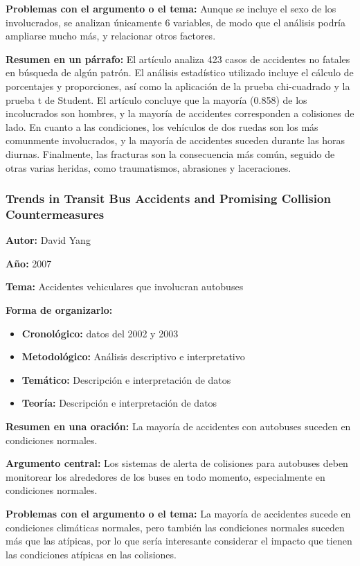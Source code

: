 \documentclass{book}
\begin{document}
\textbf{Problemas con el argumento o el tema:} Aunque se incluye el sexo de los involucrados, se analizan únicamente 6 variables, de modo que el análisis podría ampliarse mucho más, y relacionar otros factores.

\textbf{Resumen en un párrafo:} El artículo analiza 423 casos de accidentes no fatales en búsqueda de algún patrón. El análisis estadístico utilizado incluye el cálculo de porcentajes y proporciones, así como la aplicación de la prueba chi-cuadrado y la prueba t de Student. El artículo concluye que la mayoría (0.858) de los incolucrados son hombres, y la mayoría de accidentes corresponden a colisiones de lado. En cuanto a las condiciones, los vehículos de dos ruedas son los más comunmente involucrados, y la mayoría de accidentes suceden durante las horas diurnas. Finalmente, las fracturas son la consecuencia más común, seguido de otras varias heridas, como traumatismos, abrasiones y laceraciones.


\subsubsection{Trends in Transit Bus Accidents and Promising Collision Countermeasures}
\textbf{Autor:} David Yang

\textbf{Año:} 2007

\textbf{Tema:} Accidentes vehiculares que involucran autobuses

\textbf{Forma de organizarlo:}

\begin{itemize}
\setlength{\itemindent}{0.5in}
    \item \textbf{Cronológico:} datos del 2002 y 2003
    \item \textbf{Metodológico:} Análisis descriptivo e interpretativo
    \item \textbf{Temático:} Descripción e interpretación de datos
    \item \textbf{Teoría:} Descripción e interpretación de datos
\end{itemize}

\textbf{Resumen en una oración:} La mayoría de accidentes con autobuses suceden en condiciones normales.

\textbf{Argumento central:} Los sistemas de alerta de colisiones para autobuses deben monitorear los alrededores de los buses en todo momento, especialmente en condiciones normales.

\textbf{Problemas con el argumento o el tema:} La mayoría de accidentes sucede en condiciones climáticas normales, pero también las condiciones normales suceden más que las atípicas, por lo que sería interesante considerar el impacto que tienen las condiciones atípicas en las colisiones.
\end{document}
